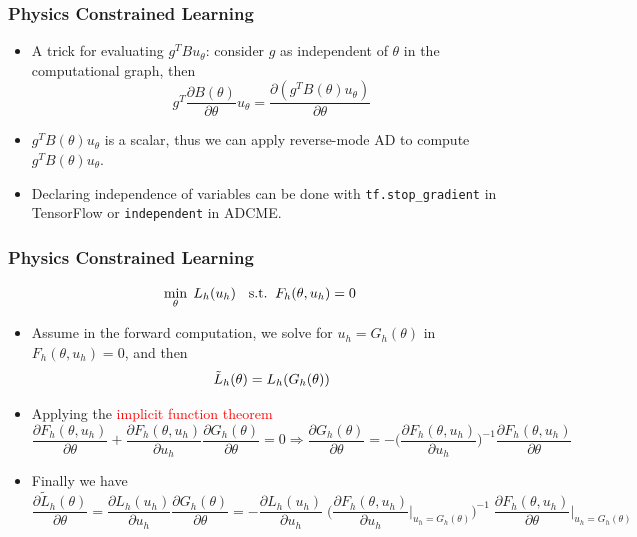\documentclass{beamer}
\begin{document}
\begin{frame}
	\frametitle{Physics Constrained Learning}
	
	\begin{itemize}
		\item A trick for evaluating $g^T Bu_\theta$: consider $g$ as independent of $\theta$ in the computational graph, then 
		$$g^T \frac{\partial B(\theta)}{\partial \theta}u_\theta = \frac{\partial (g^T B(\theta) u_\theta)}{\partial \theta}$$
		\item $g^T B(\theta) u_\theta$ is a scalar, thus we can apply reverse-mode AD to compute $g^T B(\theta) u_\theta$.
		\item Declaring independence of variables can be done with \texttt{tf.stop\_gradient} in TensorFlow or \texttt{independent} in ADCME. 
	\end{itemize}
\end{frame}




\begin{frame}
	\frametitle{Physics Constrained Learning}
	 $${\small    \min_{\theta}\; L_h(u_h) \quad \mathrm{s.t.}\;\; F_h(\theta, u_h) = 0}$$
	\begin{itemize}
\item Assume in the forward computation, we solve for $u_h=G_h(\theta)$ in $F_h(\theta, u_h)=0$, and then
$${\small\tilde L_h(\theta)  = L_h(G_h(\theta))}$$
\item Applying the \textcolor{red}{implicit function theorem}
{  \scriptsize
\begin{equation*}
\frac{{\partial {F_h(\theta, u_h)}}}{{\partial \theta }} + {\frac{{\partial {F_h(\theta, u_h)}}}{{\partial {u_h}}}}  \frac{\partial G_h(\theta)}{\partial \theta} = 0  \Rightarrow 
     \frac{\partial G_h(\theta)}{\partial \theta} =  -\Big( \frac{{\partial {F_h(\theta, u_h)}}}{{\partial {u_h}}} \Big)^{ - 1} \frac{{\partial {F_h(\theta, u_h)}}}{{\partial \theta }}
\end{equation*}
}
\item Finally we have
{\scriptsize
\begin{equation*}
    \boxed{\frac{{\partial {{\tilde L}_h}(\theta )}}{{\partial \theta }} 
    = \frac{\partial {{ L}_h}(u_h )}{\partial u_h}\frac{\partial G_h(\theta)}{\partial \theta}= - \frac{{\partial {L_h}({u_h})}}{{\partial {u_h}}} \;
    \Big( {\frac{{\partial {F_h(\theta, u_h)}}}{{\partial {u_h}}}\Big|_{u_h = {G_h}(\theta )}} \Big)^{ - 1} \;
    \frac{{\partial {F_h(\theta, u_h)}}}{{\partial \theta }}\Big|_{u_h = {G_h}(\theta )}}
\end{equation*}
}

	\end{itemize}
	
\end{frame}
\end{document}
